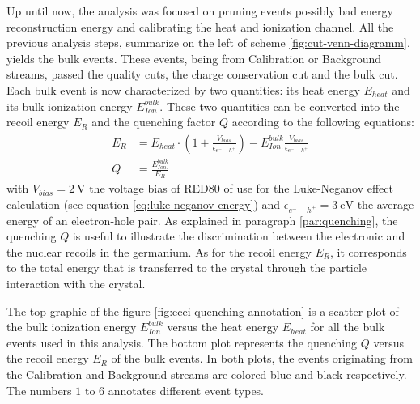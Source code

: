 Up until now, the analysis was focused on pruning events possibly bad energy reconstruction energy and calibrating the heat and ionization channel. All the previous analysis steps, summarize on the left of scheme \ref{fig:cut-venn-diagramm}, yields the bulk events. These events, being from Calibration or Background streams, passed the quality cuts, the charge conservation cut and the bulk cut.
Each bulk event is now characterized by two quantities: its heat energy $E_{heat}$ and its bulk ionization energy 
$E_{Ion.}^{bulk}$.
These two quantities can be converted into the recoil energy $E_R$ and the quenching factor $Q$ according to the following equations:
\begin{align}
\label{eq:er-quenching}
E_R 
&= 
E_{heat}
\cdot
\left( 1 + \frac{V_{bias}}{\epsilon_{e^--h^+}} \right) - E_{Ion.}^{bulk} \frac{V_{bias}}{\epsilon_{e^--h^+}}
\\
Q &= \frac{E_{Ion.}^{bulk}}{E_R}
\end{align}
with $V_{bias}=\SI{2}{\volt}$ the voltage bias of RED80 of use for the Luke-Neganov effect calculation (see equation \ref{eq:luke-neganov-energy}) and $\epsilon_{e^--h^+}=\SI{3}{\eV}$ the average energy of an electron-hole pair.
As explained in paragraph \ref{par:quenching}, the quenching $Q$ is useful to illustrate the discrimination between the electronic and the nuclear recoils in the germanium. As for the recoil energy $E_R$, it corresponds to the total energy that is transferred to the crystal through the particle interaction with the crystal.

The top graphic of the figure \ref{fig:ecei-quenching-annotation} is a scatter plot of the bulk ionization energy $E_{Ion.}^{bulk}$ versus the heat energy $E_{heat}$ for all the bulk events used in this analysis. The bottom plot represents the quenching $Q$ versus the recoil energy $E_R$ of the bulk events. In both plots, the events originating from the Calibration and Background streams are colored blue and black respectively. The numbers $1$ to $6$ annotates different event types.


